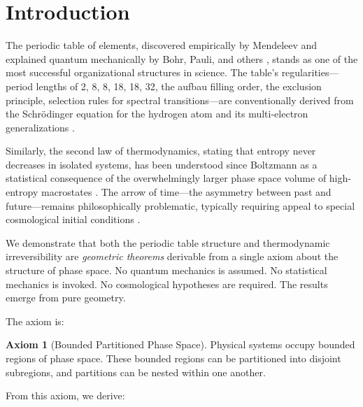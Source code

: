 \documentclass[twocolumn,10pt,a4paper]{article}
\theoremstyle{definition}
\newtheorem{axiom}{Axiom}
\theoremstyle{remark}
\begin{document}
\section{Introduction}
\label{sec:introduction}

The periodic table of elements, discovered empirically by Mendeleev \cite{mendeleev1869} and explained quantum mechanically by Bohr, Pauli, and others \cite{bohr1913,pauli1925}, stands as one of the most successful organizational structures in science. The table's regularities---period lengths of 2, 8, 8, 18, 18, 32, the aufbau filling order, the exclusion principle, selection rules for spectral transitions---are conventionally derived from the Schr\"{o}dinger equation for the hydrogen atom and its multi-electron generalizations \cite{schrodinger1926,dirac1928}.

Similarly, the second law of thermodynamics, stating that entropy never decreases in isolated systems, has been understood since Boltzmann as a statistical consequence of the overwhelmingly larger phase space volume of high-entropy macrostates \cite{boltzmann1877,gibbs1902}. The arrow of time---the asymmetry between past and future---remains philosophically problematic, typically requiring appeal to special cosmological initial conditions \cite{penrose1989,albert2000}.

We demonstrate that both the periodic table structure and thermodynamic irreversibility are \emph{geometric theorems} derivable from a single axiom about the structure of phase space. No quantum mechanics is assumed. No statistical mechanics is invoked. No cosmological hypotheses are required. The results emerge from pure geometry.

The axiom is:

\begin{axiom}[Bounded Partitioned Phase Space]
\label{axiom:main}
Physical systems occupy bounded regions of phase space. These bounded regions can be partitioned into disjoint subregions, and partitions can be nested within one another.
\end{axiom}

From this axiom, we derive:
\end{document}
